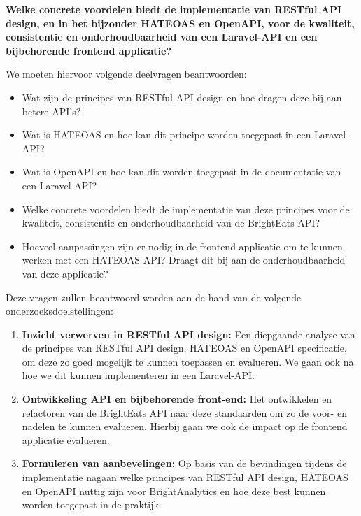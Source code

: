 \begin{center}
\textbf{Welke concrete voordelen biedt de implementatie van RESTful API design, en in het bijzonder HATEOAS en OpenAPI, voor de kwaliteit, consistentie en onderhoudbaarheid van een Laravel-API en een bijbehorende frontend applicatie?}
\end{center}

\bigskip

We moeten hiervoor volgende deelvragen beantwoorden:

\begin{itemize}
  \item Wat zijn de principes van RESTful API design en hoe dragen deze bij aan betere API's?
  \item Wat is HATEOAS en hoe kan dit principe worden toegepast in een Laravel-API?
  \item Wat is OpenAPI en hoe kan dit worden toegepast in de documentatie van een Laravel-API?
  \item Welke concrete voordelen biedt de implementatie van deze principes voor de kwaliteit, consistentie en onderhoudbaarheid van de BrightEats API?
  \item Hoeveel aanpassingen zijn er nodig in de frontend applicatie om te kunnen werken met een HATEOAS API? Draagt dit bij aan de onderhoudbaarheid van deze applicatie?
\end{itemize}

Deze vragen zullen beantwoord worden aan de hand van de volgende onderzoeksdoelstellingen:

\bigskip

\begin{enumerate}
\item \textbf{Inzicht verwerven in RESTful API design:} Een diepgaande analyse van de principes van RESTful API design, HATEOAS en OpenAPI specificatie, om deze zo goed mogelijk te kunnen toepassen en evalueren. We gaan ook na hoe we dit kunnen implementeren in een Laravel-API.
\item \textbf{Ontwikkeling API en bijbehorende front-end:} Het ontwikkelen en refactoren van de BrightEats API naar deze standaarden om zo de voor- en nadelen te kunnen evalueren. Hierbij gaan we ook de impact op de frontend applicatie evalueren.
\item \textbf{Formuleren van aanbevelingen:} Op basis van de bevindingen tijdens de implementatie nagaan welke principes van RESTful API design, HATEOAS en OpenAPI nuttig zijn voor BrightAnalytics en hoe deze best kunnen worden toegepast in de praktijk.
\end{enumerate}

